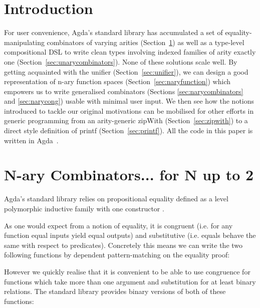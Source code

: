 \section*{Introduction}

For user convenience, Agda's standard library has accumulated a set of
equality-manipulating combinators of varying arities (Section~\ref{sec:nary2})
as well as a type-level compositional DSL to write clean types involving
indexed families of arity exactly one (Section~\ref{sec:unarycombinators}).
None of these solutions scale well. By getting acquainted with the unifier
(Section~\ref{sec:unifier}), we can design a good representation of n-ary
function spaces (Section~\ref{sec:naryfunction}) which empowers us to write
generalised combinators (Sections \ref{sec:narycombinators} and \ref{sec:narycong})
usable with minimal user input. We then see how the notions introduced to
tackle our original motivations can be mobilised for other efforts in generic
programming from an arity-generic zipWith (Section~\ref{sec:zipwith}) to a
direct style definition of printf (Section~\ref{sec:printf}).
All the code in this paper is written in Agda~\cite{DBLP:conf/afp/Norell08}.

\section{N-ary Combinators... for N up to 2}\label{sec:nary2}

Agda's standard library relies on propositional equality defined as
a level polymorphic inductive family with one constructor .


As one would expect from a notion of equality, it is congruent (i.e.
for any function equal inputs yield equal outputs) and substitutive
(i.e. equals behave the same with respect to predicates). Concretely
this means we can write the two following functions by dependent
pattern-matching on the equality proof:


However we quickly realise that it is convenient to be able to use
congruence for functions which take more than one argument and
substitution for at least binary relations. The standard library
provides binary versions of both of these functions:


